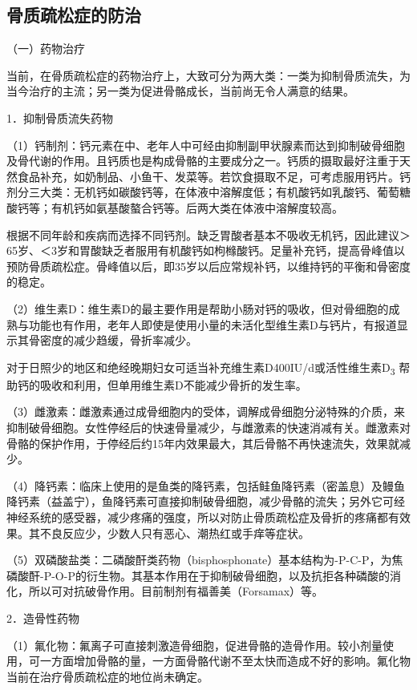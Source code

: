 \hypertarget{text00004.htmlux5cux23mllj36}{%
\subsection{骨质疏松症的防治}\label{text00004.htmlux5cux23mllj36}}

（一）药物治疗

当前，在骨质疏松症的药物治疗上，大致可分为两大类：一类为抑制骨质流失，为当今治疗的主流；另一类为促进骨骼成长，当前尚无令人满意的结果。

{1．抑制骨质流失药物}

（1）钙制剂：钙元素在中、老年人中可经由抑制副甲状腺素而达到抑制破骨细胞及骨代谢的作用。且钙质也是构成骨骼的主要成分之一。钙质的摄取最好注重于天然食品补充，如奶制品、小鱼干、发菜等。若饮食摄取不足，可考虑服用钙片。钙剂分三大类：无机钙如碳酸钙等，在体液中溶解度低；有机酸钙如乳酸钙、葡萄糖酸钙等；有机钙如氨基酸螯合钙等。后两大类在体液中溶解度较高。

根据不同年龄和疾病而选择不同钙剂。缺乏胃酸者基本不吸收无机钙，因此建议＞65岁、＜3岁和胃酸缺乏者服用有机酸钙如枸橼酸钙。足量补充钙，提高骨峰值以预防骨质疏松症。骨峰值以后，即35岁以后应常规补钙，以维持钙的平衡和骨密度的稳定。

（2）维生素D：维生素D的最主要作用是帮助小肠对钙的吸收，但对骨细胞的成熟与功能也有作用，老年人即使是使用小量的未活化型维生素D与钙片，有报道显示其骨密度的减少趋缓，骨折率减少。

对于日照少的地区和绝经晚期妇女可适当补充维生素D400IU/d或活性维生素D\textsubscript{3}
帮助钙的吸收和利用，但单用维生素D不能减少骨折的发生率。

（3）雌激素：雌激素通过成骨细胞内的受体，调解成骨细胞分泌特殊的介质，来抑制破骨细胞。女性停经后的快速骨量减少，与雌激素的快速消减有关。雌激素对骨骼的保护作用，于停经后约15年内效果最大，其后骨骼不再快速流失，效果就减少。

（4）降钙素：临床上使用的是鱼类的降钙素，包括鲑鱼降钙素（密盖息）及鳗鱼降钙素（益盖宁），鱼降钙素可直接抑制破骨细胞，减少骨骼的流失；另外它可经神经系统的感受器，减少疼痛的强度，所以对防止骨质疏松症及骨折的疼痛都有效果。其不良反应少，少数人只有恶心、潮热红或手痒等症状。

（5）双磷酸盐类：二磷酸酐类药物（bisphosphonate）基本结构为-P-C-P，为焦磷酸酐-P-O-P的衍生物。其基本作用在于抑制破骨细胞，以及抗拒各种磷酸的消化，所以可对抗破骨作用。目前制剂有福善美（Forsamax）等。

{2．造骨性药物}

（1）氟化物：氟离子可直接刺激造骨细胞，促进骨骼的造骨作用。较小剂量使用，可一方面增加骨骼的量，一方面骨骼代谢不至太快而造成不好的影响。氟化物当前在治疗骨质疏松症的地位尚未确定。

